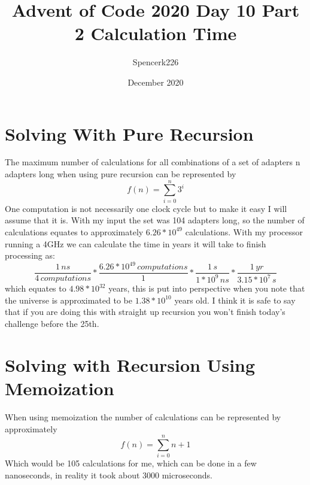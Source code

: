 \documentclass{article}
\title{Advent of Code 2020 Day 10 Part 2 Calculation Time}
\author{Spencerk226}
\date{December 2020}
\begin{document}
\maketitle

\section{Solving With Pure Recursion}
\quad The maximum number of calculations for all combinations of a set of adapters n adapters long when using pure recursion can be represented by 
\begin{equation*}
    f(n) = \sum_{i = 0}^n 3^i
\end{equation*}
\quad One computation is not necessarily one clock cycle but to make it easy I will assume that it is.
With my input the set was 104 adapters long, so the number of calculations equates to approximately $6.26*10^{49}$ calculations. 
\newline
\newline
\quad With my processor running a 4GHz we can calculate the time in years it will take to finish processing as:
\begin{equation*}
    \frac{1\,ns}{4\,computations} * \frac{6.26*10^{49}\,computations}{1} * \frac{1\, s}{1*10^9\,ns} * \frac{1\,yr}{3.15*10^7\,s}
\end{equation*}
which equates to $4.98*10^{32}$ years, this is put into perspective when you note that the universe is approximated to be $1.38*10^{10}$ years old.
\newline
\newline
\quad I think it is safe to say that if you are doing this with straight up recursion you won't finish today's challenge before the 25th.
\section{Solving with Recursion Using Memoization}
When using memoization the number of calculations can be represented by approximately
\begin{equation*}
    f(n) = \sum_{i = 0}^n n + 1
\end{equation*}
Which would be 105 calculations for me, which can be done in a few nanoseconds, in reality it took about 3000 microseconds.
\end{document}
